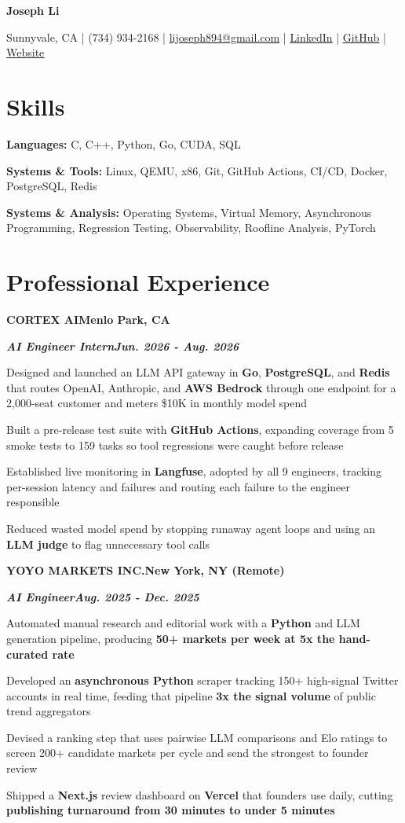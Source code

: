 \documentclass[10pt]{article}
\renewcommand{\resumeheader}[2]{%
  {\centering\fontsize{16}{18}\selectfont\bfseries #1\par}%
  \vspace{4pt}%
  {\centering\fontsize{10.5}{13}\selectfont #2\par}%
  \vspace{6pt}%
}
\renewcommand{\skill}[2]{\textbf{#1:} #2\par\vspace{1.5pt}}
\newcommand{\job}[4]{%
  \vspace{0pt}%
  \textbf{\MakeUppercase{#1}}\hfill\textbf{#2}\par
  \vspace{0.5pt}%
  \textbf{\textit{#3}}\hfill\textbf{\textit{#4}}\par
}
\begin{document}
\resumeheader{Joseph Li}{%
Sunnyvale, CA | (734) 934-2168 | \href{mailto:lijoseph894@gmail.com}{lijoseph894@gmail.com} | \href{https://www.linkedin.com/in/lijoseph894/}{\underline{LinkedIn}} | \href{https://github.com/josephl894}{\underline{GitHub}} | \href{https://josephl894.github.io}{\underline{Website}}}

\section{Skills}
\skill{Languages}{C, C++, Python, Go, CUDA, SQL}
\skill{Systems \& Tools}{Linux, QEMU, x86, Git, GitHub Actions, CI/CD, Docker, PostgreSQL, Redis}
\skill{Systems \& Analysis}{Operating Systems, Virtual Memory, Asynchronous Programming, Regression Testing, Observability, Roofline Analysis, PyTorch}

\section{Professional Experience}
\job{Cortex AI}{Menlo Park, CA}{AI Engineer Intern}{Jun. 2026 - Aug. 2026}
\begin{bullets}
  \item Designed and launched an LLM API gateway in \textbf{Go}, \textbf{PostgreSQL}, and \textbf{Redis} that routes OpenAI, Anthropic, and \textbf{AWS Bedrock} through one endpoint for a 2,000-seat customer and meters \$10K in monthly model spend
  \item Built a pre-release test suite with \textbf{GitHub Actions}, expanding coverage from 5 smoke tests to 159 tasks so tool regressions were caught before release
  \item Established live monitoring in \textbf{Langfuse}, adopted by all 9 engineers, tracking per-session latency and failures and routing each failure to the engineer responsible
  \item Reduced wasted model spend by stopping runaway agent loops and using an \textbf{LLM judge} to flag unnecessary tool calls
\end{bullets}

\vspace{3pt}
\job{Yoyo Markets Inc.}{New York, NY (Remote)}{AI Engineer}{Aug. 2025 - Dec. 2025}
\begin{bullets}
  \item Automated manual research and editorial work with a \textbf{Python} and LLM generation pipeline, producing \textbf{50+ markets per week at 5x the hand-curated rate}
  \item Developed an \textbf{asynchronous Python} scraper tracking 150+ high-signal Twitter accounts in real time, feeding that pipeline \textbf{3x the signal volume} of public trend aggregators
  \item Devised a ranking step that uses pairwise LLM comparisons and Elo ratings to screen 200+ candidate markets per cycle and send the strongest to founder review
  \item Shipped a \textbf{Next.js} review dashboard on \textbf{Vercel} that founders use daily, cutting \textbf{publishing turnaround from 30 minutes to under 5 minutes}
\end{bullets}
\end{document}
